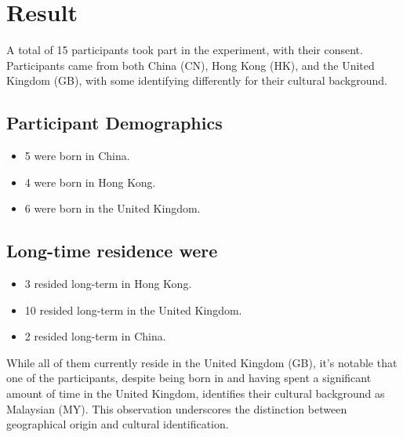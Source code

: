 \chapter{Result}

A total of 15 participants took part in the experiment, with their consent. Participants came from both China (CN), Hong Kong (HK), and the United Kingdom (GB), with some identifying differently for their cultural background.
\section{Participant Demographics}
\begin{itemize}
\item 5 were born in China.
\item 4 were born in Hong Kong.
\item 6 were born in the United Kingdom.
\end{itemize}
\section{Long-time residence were}
\begin{itemize}
\item 3 resided long-term in Hong Kong.
\item 10 resided long-term in the United Kingdom.
\item 2 resided long-term in China.
\end{itemize}

While all of them currently reside in the United Kingdom (GB), it's notable that one of the participants, despite being born in and having spent a significant amount of time in the United Kingdom, identifies their cultural background as Malaysian (MY). This observation underscores the distinction between geographical origin and cultural identification.

